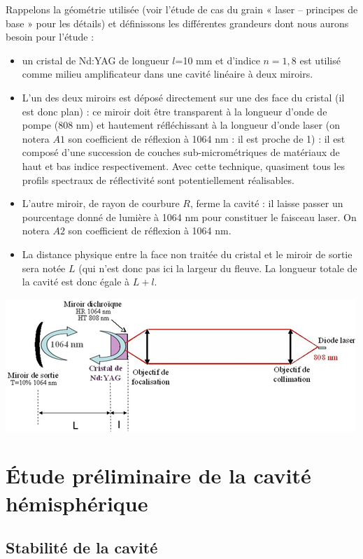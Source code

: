 \documentclass{book}
\begin{document}
Rappelons la géométrie utilisée (voir l'étude de cas du grain « laser – principes de base » pour les détails) et définissons les différentes grandeurs dont nous aurons besoin pour l'étude :

\begin{itemize}
    \item un cristal de Nd:YAG de longueur \(l\)=10 mm et d'indice \(n=1,8\) est utilisé comme milieu amplificateur dans une cavité linéaire à deux miroirs.
    \item L'un des deux miroirs est déposé directement sur une des face du cristal (il est donc plan) : ce miroir doit être transparent à la longueur d'onde de pompe (808 nm) et hautement réfléchissant à la longueur d'onde laser (on notera \(A1\) son coefficient de réflexion à 1064 nm : il est proche de 1) : il est composé d'une succession de couches sub-micrométriques de matériaux de haut et bas indice respectivement. Avec cette technique, quasiment tous les profils spectraux de réflectivité sont potentiellement réalisables.
    \item L'autre miroir, de rayon de courbure \(R\), ferme la cavité : il laisse passer un pourcentage donné de lumière à 1064 nm pour constituer le faisceau laser. On notera \(A2\) son coefficient de réflexion à 1064 nm.
    \item La distance physique entre la face non traitée du cristal et le miroir de sortie sera notée \(L\) (qui n'est donc pas ici la largeur du fleuve. La longueur totale de la cavité est donc égale à \(L+l\).
\end{itemize}

{\centering
\includegraphics[scale=1.7]{images/EC_Fig1.jpg}
\par}

\section{Étude préliminaire de la cavité hémisphérique}
\subsection{Stabilité de la cavité}
\end{document}
